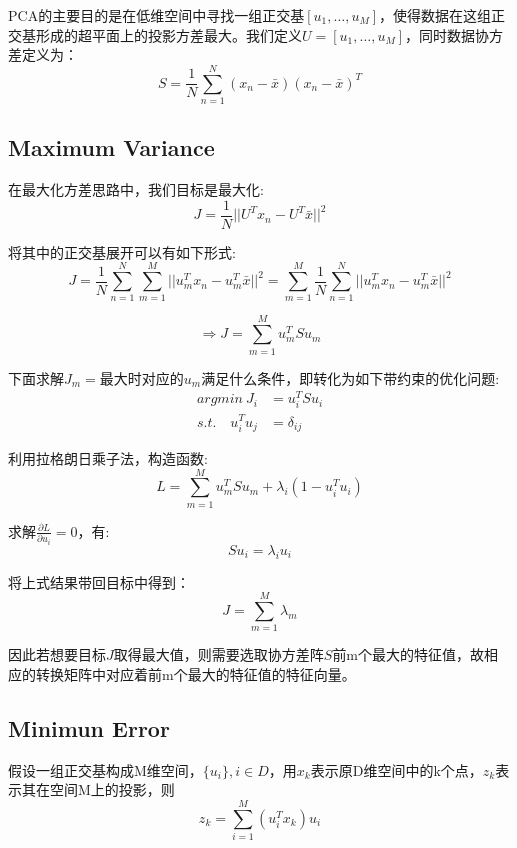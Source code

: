 \documentclass[UTF8]{ctexart}
\begin{document}
PCA的主要目的是在低维空间中寻找一组正交基$[u_1,\dots,u_M]$，使得数据在这组正交基形成的超平面上的投影方差最大。我们定义$U=[u_1,\dots,u_M]$，同时数据协方差定义为：
$$S=\frac{1}{N}\sum^N_{n=1}(x_n-\bar{x})(x_n-\bar{x})^T$$
\subsection{Maximum Variance}
在最大化方差思路中，我们目标是最大化:
\begin{equation}
    J=\frac{1}{N}||U^Tx_n-U^T\bar{x}||^2
\end{equation}

将其中的正交基展开可以有如下形式:
\begin{equation}
    J = \frac{1}{N}\sum^N_{n=1}\sum^M_{m=1}||u_m^Tx_n-u^T_m\bar{x}||^2 = \sum^M_{m=1}\frac{1}{N}\sum^N_{n=1}||u^T_mx_n-u^T_m\bar{x}||^2
\end{equation}

\begin{equation}
    \Rightarrow J = \sum^M_{m=1}u^T_mSu_m
\end{equation}

下面求解$J_m = $最大时对应的$u_m$满足什么条件，即转化为如下带约束的优化问题:
\begin{equation}
    \begin{aligned}
        argmin\ J_i &= u^T_i Su_i\\
        s.t.\quad u^T_iu_j&=\delta_{ij}
    \end{aligned}
\end{equation}

利用拉格朗日乘子法，构造函数:
\begin{equation}
    L = \sum^M_{m=1}u^T_mSu_m + \lambda_i(1-u^T_iu_i)
\end{equation}

求解$\frac{\partial L}{\partial u_i} = 0$，有:
\begin{equation}
    Su_i = \lambda_iu_i
\end{equation}

将上式结果带回目标中得到：
\begin{equation}
    J = \sum^M_{m=1}\lambda_m
\end{equation}

因此若想要目标$J$取得最大值，则需要选取协方差阵$S$前m个最大的特征值，故相应的转换矩阵中对应着前m个最大的特征值的特征向量。

\subsection{Minimun Error}
假设一组正交基构成M维空间，$\{u_i\},i\in D$，用$x_k$表示原D维空间中的k个点，$z_k$表示其在空间M上的投影，则
\begin{equation}
    z_k = \sum^M_{i=1}(u_i^Tx_k)u_i
\end{equation}
\end{document}
